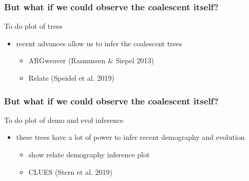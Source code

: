\documentclass{beamer}
\begin{document}

\begin{frame}
	\frametitle{But what if we could observe the coalescent itself?}

	\begin{alertblock}{To do}
		plot of trees
	\end{alertblock}

	\begin{itemize}
		\item recent advances allow us to infer the coalescent trees \pause
		\begin{itemize}
			\item ARGweaver (Rasmussen \& Siepel 2013) \pause
			\item Relate (Speidel et al. 2019) \pause
		\end{itemize}
	\end{itemize}

\end{frame}


\begin{frame}
	\frametitle{But what if we could observe the coalescent itself?}

	\begin{alertblock}{To do}
		plot of demo and evol inference
	\end{alertblock}

	\begin{itemize}
		\item these trees have a lot of power to infer recent demography and evolution \pause
		\begin{itemize}
			\item show relate demography inference plot
			\item CLUES (Stern et al. 2019) \pause
		\end{itemize}
	\end{itemize}

\end{frame}

\end{document}
